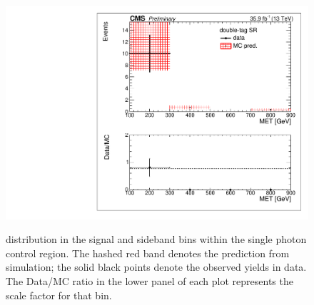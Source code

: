 \begin{figure}[hbp!]
 \includegraphics[trim={5px 5px 5px 5px},clip,width=0.45\linewidth]{figs/SUS17006/ABCDscaleFactors_MET_double-tagSR_photon.pdf}\\
 \caption{
 \ptmiss distribution in the signal and sideband bins within the single photon control region. The hashed red band denotes the prediction from simulation; the solid black points denote the observed yields in data. The Data/MC ratio in the lower panel of each plot represents the scale factor for that bin.
 }
\label{fig:closurephoton}
\end{figure}

